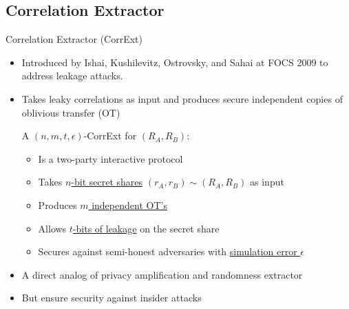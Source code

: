 \subsection{Correlation Extractor}
\begin{frame}{Correlation Extractor (CorrExt)}
	\begin{itemize}
		\item Introduced by Ishai, Kushilevitz, Ostrovsky, and Sahai at FOCS 2009 \cite{FOCS:IKOS09} to address leakage attacks. 
		\item Takes leaky correlations as input and produces secure independent
		copies of oblivious transfer (OT)
		\pause
		\begin{definition}
			A $ (n,m,t,\epsilon) $-CorrExt for $ (R_A, R_B) $: 
			\begin{itemize}
				\item Is a two-party interactive protocol	
				\item Takes \underline{$n$-bit secret shares} $ (r_A, r_B) \sim (R_A, R_B) $ as input
				\item Produces \underline{$ m $ independent OT's}
				\item Allows \underline{$ t $-bits of leakage} on the secret share
				\item Secures against semi-honest adversaries with \underline{simulation error $ \epsilon $}
			\end{itemize}
		\end{definition}
		\pause
		\item A direct analog of privacy amplification and randomness extractor
		\item But ensure security against insider attacks
	\end{itemize}
\end{frame}
	


